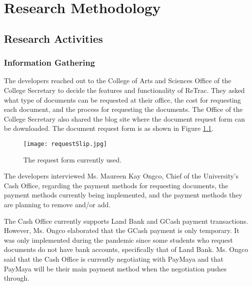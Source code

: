 \chapter{Research Methodology}

\section{Research Activities}

\subsection{Information Gathering}
The developers reached out to the College of Arts and Sciences Office of the College Secretary to decide the features and functionality of ReTrac. They asked what type of documents can be requested at their office, the cost for requesting each document, and the process for requesting the documents. The Office of the College Secretary also shared the blog site where the document request form can be downloaded. The document request form is as shown in Figure \ref{fig:requestSlip}.

\begin{figure}[!htb]
  \texttt{[image: requestSlip.jpg]}
  \caption{\label{fig:requestSlip} The request form currently used.}
\end{figure}

The developers interviewed Ms. Maureen Kay Ongco, Chief of the University's Cash Office, regarding the payment methods for requesting documents, the payment methods currently being implemented, and the payment methods they are planning to remove and/or add. 

The Cash Office currently supports Land Bank and GCash payment transactions. However, Ms. Ongco elaborated that the GCash payment is only temporary. It was only implemented during the pandemic since some students who request documents do not have bank accounts, specifically that of Land Bank. Ms. Ongco said that the Cash Office is currently negotiating with PayMaya and that PayMaya will be their main payment method when the negotiation pushes through.


